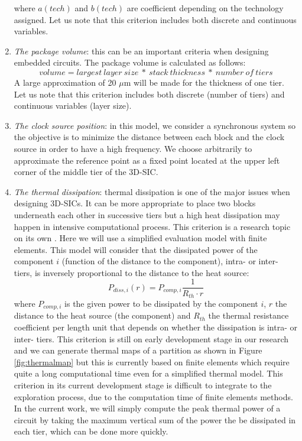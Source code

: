 \begin{enumerate}
where $a(tech)$ and $b(tech)$ are coefficient depending on the technology assigned.
Let us note that this criterion includes both discrete and continuous variables.
\item \textit{The package volume}: this can be an important criteria when designing embedded circuits. The package volume is calculated as follows:
\begin{equation}
volume=largest~layer~size~*~stack~thickness~*~number~of~tiers
\label{eqn:volume}
\end{equation}
A large approximation of 20 $\mu$m will be made for the thickness of one tier.
Let us note that this criterion includes both discrete (number of tiers) and continuous variables (layer size).
\item \textit{The clock source position}: in this model, we consider a synchronous system so the objective is to minimize the distance between each block and the clock source in order to have a high frequency. We choose arbitrarily to approximate the reference point as a fixed point located at the upper left corner of the middle tier of the 3D-SIC.
\item \textit{The thermal dissipation}: thermal dissipation is one of the major issues when designing 3D-SICs. It can be more appropriate to place two blocks underneath each other in successive tiers but a high heat dissipation may happen in intensive computational process. This criterion is a research topic on its own \cite{1112292, 1486402}. Here we will use a simplified evaluation model with finite elements. This model will consider that the dissipated power of the component $i$ (function of the distance to the component), intra- or inter- tiers, is inversely proportional to the distance to the heat source:
\begin{equation}
P_{diss,i}(r) = P_{comp,i} \frac{1}{R_{th} \cdot r}
\label{eqn:pdiss}
\end{equation}
where $P_{comp,i}$ is the given power to be dissipated by the component $i$, $r$ the distance to the heat source (the component) and $R_{th}$ the thermal resistance coefficient per length unit that depends on whether the dissipation is intra- or inter- tiers.
This criterion is still on early development stage in our research and we can generate thermal maps of a partition as shown in Figure \ref{fig:thermalmap} but this is currently based on finite elements \cite{4263187} which require quite a long computational time even for a simplified thermal model.
This criterion in its current development stage is difficult to integrate to the exploration process, due to the computation time of finite elements methods. In the current work, we will simply compute the peak thermal power of a circuit by taking the maximum vertical sum of the power the be dissipated in each tier, which can be done more quickly.


\end{enumerate}
